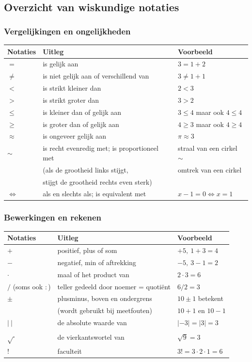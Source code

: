 \subsection{Overzicht van wiskundige notaties}

\subsubsection{Vergelijkingen en ongelijkheden}

\begin{center}
	\begin{tabular}{lll}
	Notaties & Uitleg & Voorbeeld \\
	\hline
	$=$ & is gelijk aan & $3=1+2$ \\
	$\ne$ & is niet gelijk aan of verschillend van & $3\ne1+1$ \\
	$<$ & is strikt kleiner dan & $2<3$ \\
	$>$ & is strikt groter dan & $3>2$ \\
	$\le$ & is kleiner dan of gelijk aan & $3\le 4$ maar ook $4\le 4$ \\
	$\ge$ & is groter dan of gelijk aan & $4\ge 3$ maar ook $4\ge 4$ \\
	$\approx$ & is ongeveer gelijk aan & $\pi \approx 3$ \\
	$\sim$ & is recht evenredig met; is proportioneel met & straal van een cirkel $\sim$ \\
	& (als de grootheid links stijgt, & omtrek van een cirkel \\
	& stijgt de grootheid rechts even sterk) & \\
	$\iff$ & als en slechts als; is equivalent met & $x-1=0 \iff x=1$ \\
	\end{tabular}
\end{center}

\subsubsection{Bewerkingen en rekenen}

\begin{center}
	\begin{tabular}{lll}
		Notaties & Uitleg & Voorbeeld \\
		\hline
		$+$ & positief, plus of som & $+5, \ 1+3=4$ \\
		$-$ & negatief, min of aftrekking & $-5,\ 3-1=2$ \\
		$\cdot$ & maal of het product van & $2\cdot3=6$ \\
		$/$ (soms ook $:$) & teller gedeeld door noemer = quoti\"ent & $6/2=3$ \\
		$\pm$ & plusminus, boven en ondergrens & $10 \pm 1$ betekent  \\
		& (wordt gebruikt bij meetfouten) & $10+1$ en $10-1$ \\
		$| \ |$ & de absolute waarde van & $|-3|=|3|=3$ \\
		$\sqrt{\ }$ & de vierkantswortel van & $\sqrt{9}=3$ \\
		$!$ & faculteit & $3!=3\cdot2\cdot1=6$
	\end{tabular}
\end{center}

